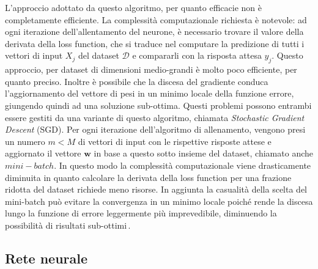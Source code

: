 % 
\noindent L'approccio adottato da questo algoritmo, per quanto efficacie non è completamente efficiente. La complessità computazionale richiesta è notevole: ad ogni iterazione dell'allentamento del neurone, è necessario trovare il valore della derivata della loss function, che si traduce nel computare la predizione di tutti i vettori di input $X_j$ del dataset $\mathcal{D}$ e compararli con la risposta attesa $y_j$. Questo approccio, per dataset di dimensioni medio-grandi è molto poco efficiente, per quanto preciso. Inoltre è possibile che la discesa del gradiente conduca l'aggiornamento del vettore di pesi in un minimo locale della funzione errore, giungendo quindi ad una soluzione sub-ottima. Questi problemi possono entrambi essere gestiti da una variante di questo algoritmo, chiamata \textit{Stochastic Gradient Descent} (\acs{SGD}). Per ogni iterazione dell'algoritmo di allenamento, vengono presi un numero $m < M$ di vettori di input con le rispettive risposte attese e aggiornato il vettore $\mathbf{w}$ in base a questo sotto insieme del dataset, chiamato anche $mini-batch$. In questo modo la complessità computazionale viene drasticamente diminuita in quanto calcolare la derivata della loss function per una frazione ridotta del dataset richiede meno risorse. In aggiunta la casualità della scelta del mini-batch può evitare la convergenza in un minimo locale poiché rende la discesa lungo la funzione di errore leggermente più imprevedibile, diminuendo la possibilità di risultati sub-ottimi\,\cite{lu2022gradient, andrychowicz2016learning, nielsen2015neural}.

\subsection{Rete neurale}

